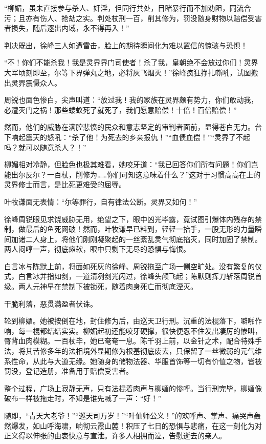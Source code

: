 “柳媚，虽未直接参与杀人、奸淫，但同行共处，目睹暴行而不加劝阻，同流合污；且亦有伤人、抢劫之实。判处杖刑一百，削其修为，罚没随身财物以赔偿受害者损失，随后逐出内域，永不得再入！”

判决既出，徐峰三人如遭雷击，脸上的期待瞬间化为难以置信的惊骇与恐惧！

“不！你们不能杀我！我是灵界界门司使者！杀了我，皇朝绝不会放过你们！灵界大军顷刻即至，尔等下界弹丸之地，必将灰飞烟灭！”徐峰疯狂挣扎嘶吼，试图搬出灵界震慑众人。

周锐也面色惨白，尖声叫道：“放过我！我的家族在灵界颇有势力，你们敢动我，必遭灭门之祸！那些蝼蚁死了就死了，我们愿意赔偿！十倍！百倍赔偿！”

然而，他们的威胁在满腔悲愤的民众和意志坚定的审判者面前，显得苍白无力。台下响起震天的怒吼：“杀了他！为死去的乡亲报仇！”“血债血偿！”“灵界了不起吗？就可以随意杀人？！”

柳媚相对冷静，但脸色也极其难看，她咬牙道：“我已回答你们所有问题！你们岂能出尔反尔？一百杖，削修为……你们可知这意味着什么？”这对于习惯高高在上的灵界修士而言，是比死更难受的屈辱。

叶牧谦面无表情：“尔等罪行，自有律法公断。灵界又如何！”

徐峰周锐眼见求饶威胁无用，绝望之下，眼中凶光毕露，竟试图引爆体内残存的禁制，做最后的鱼死网破！然而，叶牧谦早已料到，轻轻一抬手，一股无形的力量瞬间加诸二人身上，将他们刚刚凝聚起的一丝紊乱灵气彻底掐灭，同时加固了禁制。两人闷哼一声，彻底瘫软，眼中只剩下无尽的恐惧与悔恨。

白言冰与陈默上前，将面如死灰的徐峰、周锐拖至广场一侧空旷处。没有繁复的仪式，白言冰并指如剑，一道清冽剑光闪过，徐峰头颅飞起；陈默则挥刀斩落周锐首级。两人元神早在禁制下被锁死，随着肉身死亡而彻底湮灭。

干脆利落，恶贯满盈者伏诛。

轮到柳媚。她被按倒在地，封住修为后，由巡天卫行刑。沉重的法棍落下，噼啪作响，每一棍都结结实实。柳媚起初还能咬牙硬撑，很快便忍不住发出凄厉的惨叫，臀背血肉模糊。一百杖毕，她已奄奄一息。陈千羽上前，以金针之术，配合特殊手法，将其苦修多年的法相境外显期修为根基彻底废去，只保留了一丝微弱的元气维系性命，从此与大道无缘。她随身的储物法器、华服首饰等一切有价值之物，皆被罚没，登记造册，准备用于赔偿受害者。

整个过程，广场上寂静无声，只有法棍着肉声与柳媚的惨呼。当行刑完毕，柳媚像破布一样被拖走时，不知是谁先喊了一声：“好！”

随即，“青天大老爷！”“巡天司万岁！”“叶仙师公义！”的欢呼声、掌声、痛哭声轰然爆发，如山呼海啸，响彻云霞山麓！积压了七日的恐惧与悲痛，在这一刻化为对正义得以伸张的由衷快意与宣泄。许多人相拥而泣，告慰逝去的亲人。

